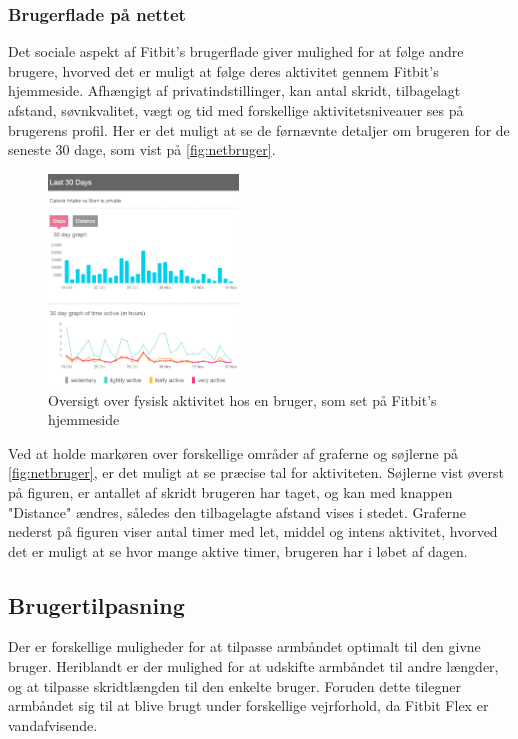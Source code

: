 \subsubsection{Brugerflade på nettet}

Det sociale aspekt af Fitbit's brugerflade giver mulighed for at følge andre brugere, hvorved det er muligt at følge deres aktivitet gennem Fitbit's hjemmeside. Afhængigt af privatindstillinger, kan antal skridt, tilbagelagt afstand, søvnkvalitet, vægt og tid med forskellige aktivitetsniveauer ses på brugerens profil. Her er det muligt at se de førnævnte detaljer om brugeren for de seneste $30$ dage, som vist på \autoref{fig:netbruger}.

\begin{figure}[H]
	\centering
	\includegraphics[width=0.45\textwidth]{figures/Netbruger}
	\caption{Oversigt over fysisk aktivitet hos en bruger, som set på Fitbit's hjemmeside}
	\label{fig:netbruger}
\end{figure}

Ved at holde markøren over forskellige områder af graferne og søjlerne på \autoref{fig:netbruger}, er det muligt at se præcise tal for aktiviteten. Søjlerne vist øverst på figuren, er antallet af skridt brugeren har taget, og kan med knappen "Distance" ændres, således den tilbagelagte afstand vises i stedet. Graferne nederst på figuren viser antal timer med let, middel og intens aktivitet, hvorved det er muligt at se hvor mange aktive timer, brugeren har i løbet af dagen. 

\subsection{Brugertilpasning} \label{sec:brugertilpasning}
Der er forskellige muligheder for at tilpasse armbåndet optimalt til den givne bruger. Heriblandt er der mulighed for at udskifte armbåndet til andre længder, og at tilpasse skridtlængden til den enkelte bruger. Foruden dette tilegner armbåndet sig til at blive brugt under forskellige vejrforhold, da Fitbit Flex er vandafvisende. 

